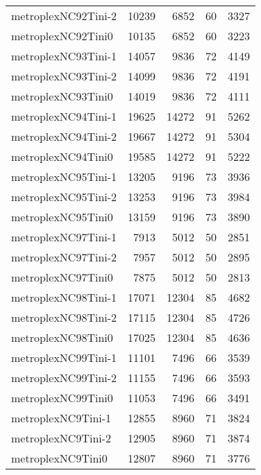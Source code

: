 \begin{longtable}{lrrrr}
metroplexNC92Tini-2 & 10239 & 6852 & 60 & 3327 \\
metroplexNC92Tini0 & 10135 & 6852 & 60 & 3223 \\
metroplexNC93Tini-1 & 14057 & 9836 & 72 & 4149 \\
metroplexNC93Tini-2 & 14099 & 9836 & 72 & 4191 \\
metroplexNC93Tini0 & 14019 & 9836 & 72 & 4111 \\
metroplexNC94Tini-1 & 19625 & 14272 & 91 & 5262 \\
metroplexNC94Tini-2 & 19667 & 14272 & 91 & 5304 \\
metroplexNC94Tini0 & 19585 & 14272 & 91 & 5222 \\
metroplexNC95Tini-1 & 13205 & 9196 & 73 & 3936 \\
metroplexNC95Tini-2 & 13253 & 9196 & 73 & 3984 \\
metroplexNC95Tini0 & 13159 & 9196 & 73 & 3890 \\
metroplexNC97Tini-1 & 7913 & 5012 & 50 & 2851 \\
metroplexNC97Tini-2 & 7957 & 5012 & 50 & 2895 \\
metroplexNC97Tini0 & 7875 & 5012 & 50 & 2813 \\
metroplexNC98Tini-1 & 17071 & 12304 & 85 & 4682 \\
metroplexNC98Tini-2 & 17115 & 12304 & 85 & 4726 \\
metroplexNC98Tini0 & 17025 & 12304 & 85 & 4636 \\
metroplexNC99Tini-1 & 11101 & 7496 & 66 & 3539 \\
metroplexNC99Tini-2 & 11155 & 7496 & 66 & 3593 \\
metroplexNC99Tini0 & 11053 & 7496 & 66 & 3491 \\
metroplexNC9Tini-1 & 12855 & 8960 & 71 & 3824 \\
metroplexNC9Tini-2 & 12905 & 8960 & 71 & 3874 \\
metroplexNC9Tini0 & 12807 & 8960 & 71 & 3776 \\
\end{longtable}
